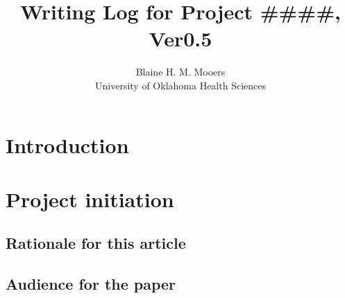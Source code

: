 \documentclass[10pt,letterpaper]{article}
\title{Writing Log for Project \#\#\#\#, Ver0.5}
\author{Blaine H. M. Mooers \\University of Oklahoma Health Sciences}
\begin{document}
\maketitle
\tableofcontents


\section*{Introduction}






\section{Project initiation}
\subsection{Rationale for this article}
\label{sub:why}



\subsection{Audience for the paper}
\label{sub:audience}
\end{document}
